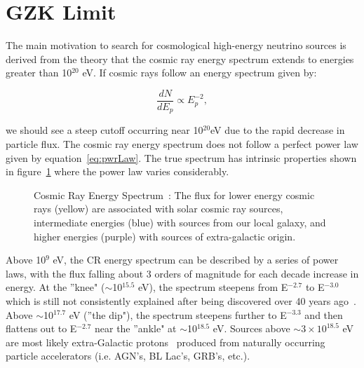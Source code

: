 \section{\textbf{GZK} Limit}
\label{s:gzk}
\par The main motivation to search for cosmological high-energy neutrino sources is derived from the theory that the cosmic ray energy spectrum extends to energies greater than 10$^{20}$ eV.  If cosmic rays follow an energy spectrum given by:

\begin{equation}
\frac{dN}{dE_p} \propto E_{p}^{-2},
\label{eq:pwrLaw}
\end{equation}

\noindent we should see a steep cutoff occurring near 10$^{20}$eV due to the rapid decrease in particle flux.  The cosmic ray energy spectrum does not follow a perfect power law given by equation~\ref{eq:pwrLaw}.  The true spectrum has intrinsic properties shown in figure~\ref{fig:cosmicRayFlux} where the power law varies considerably.

\begin{figure}[htbp]
\centering
\epsfxsize=4.0in
\caption{Cosmic Ray Energy Spectrum~\cite{cosmicRayGNU}:  The flux for lower energy cosmic rays (yellow) are associated with solar cosmic ray sources, intermediate energies (blue) with sources from our local galaxy, and higher energies (purple) with sources of extra-galactic origin.}
\label{fig:cosmicRayFlux}
\end{figure}

\par Above 10$^9$ eV, the CR energy spectrum can be described by a series of power laws, with the flux falling about 3 orders of magnitude for each decade increase in energy.  At the ''knee" ($\sim$10$^{15.5}$ eV), the spectrum steepens from E$^{-2.7}$ to E$^{-3.0}$ which is still not consistently explained after being discovered over 40 years ago~\cite{Kulikov.1959}.  Above $\sim$10$^{17.7}$ eV (''the dip"), the spectrum steepens further to E$^{-3.3}$ and then flattens out to E$^{-2.7}$ near the ''ankle" at $\sim$10$^{18.5}$ eV.  Sources above $\sim 3 \times 10^{18.5}$ eV are most likely extra-Galactic protons~\cite{Waxman.1998} produced from naturally occurring particle accelerators (i.e. AGN's, BL Lac's, GRB's, etc.).


